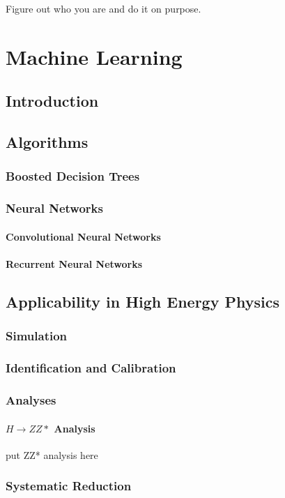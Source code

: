 \begin{savequote}[75mm]
Figure out who you are and do it on purpose.
\end{savequote}

\chapter{Machine Learning}

\section{Introduction}

\section{Algorithms}
\subsection{Boosted Decision Trees}
\subsection{Neural Networks}
\subsubsection{Convolutional Neural Networks}
\subsubsection{Recurrent Neural Networks}

\section{Applicability in High Energy Physics}
\subsection{Simulation}
\subsection{Identification and Calibration}
\subsection{Analyses}
\subsubsection{$H\rightarrow ZZ*$ Analysis}
put ZZ* analysis here
\subsection{Systematic Reduction}